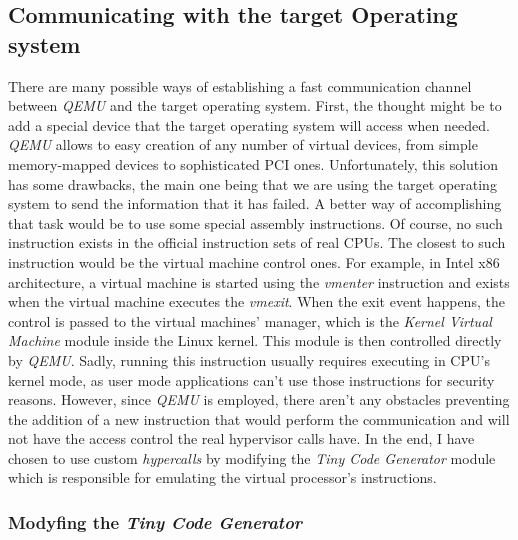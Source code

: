 \subsection{Communicating with the target Operating system}
There are many possible ways of establishing a fast communication channel between \textit{QEMU} and the target operating system. First, the thought might be to add a special device that the target operating system will access when needed. \textit{QEMU} allows to easy creation of any number of virtual devices, from simple memory-mapped devices to sophisticated PCI ones. Unfortunately, this solution has some drawbacks, the main one being that we are using the target operating system to send the information that it has failed. A better way of accomplishing that task would be to use some special assembly instructions. Of course, no such instruction exists in the official instruction sets of real CPUs. The closest to such instruction would be the virtual machine control ones. For example, in Intel x86 architecture, a virtual machine is started using the \textit{vmenter} instruction and exists when the virtual machine executes the \textit{vmexit}. When the exit event happens, the control is passed to the virtual machines' manager, which is the \textit{Kernel Virtual Machine} module inside the Linux kernel. This module is then controlled directly by \textit{QEMU}. Sadly, running this instruction usually requires executing in CPU's kernel mode, as user mode applications can't use those instructions for security reasons. However, since \textit{QEMU} is employed, there aren't any obstacles preventing the addition of a new instruction that would perform the communication and will not have the access control the real hypervisor calls have. In the end, I have chosen to use custom \textit{hypercalls} by modifying the \textit{Tiny Code Generator} module which is responsible for emulating the virtual processor's instructions.

\subsubsection{Modyfing the \textit{Tiny Code Generator}} \label{sec:tcg}
